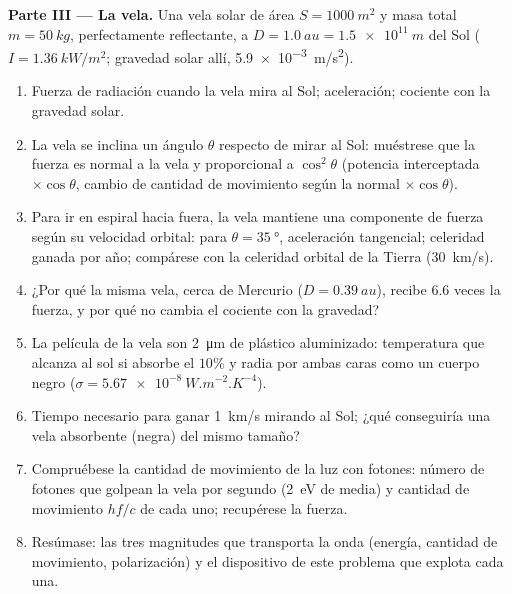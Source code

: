 \begin{problem}
\medskip
\noindent\textbf{Parte III --- La vela.}
Una vela solar de área $S = \qty{1000}{m^2}$ y masa total $m = \qty{50}{kg}$,
perfectamente reflectante, a $D = \qty{1.0}{au} = \qty{1.5e11}{m}$ del Sol
($I = \qty{1.36}{kW/m^2}$; gravedad solar allí, \qty{5.9e-3}{m/s^2}).
\begin{enumerate}[resume]
  \item Fuerza de radiación cuando la vela mira al Sol; aceleración;
        cociente con la gravedad solar.
  \item La vela se inclina un ángulo $\theta$ respecto de mirar al Sol:
        muéstrese que la fuerza es normal a la vela y proporcional a
        $\cos^2\theta$ (potencia interceptada $\times\cos\theta$, cambio de
        cantidad de movimiento según la normal $\times\cos\theta$).
  \item Para ir en espiral hacia fuera, la vela mantiene una componente de
        fuerza según su velocidad orbital: para $\theta = \qty{35}{\degree}$,
        aceleración tangencial; celeridad ganada por año; compárese con la
        celeridad orbital de la Tierra (\qty{30}{km/s}).
  \item ¿Por qué la misma vela, cerca de Mercurio ($D = \qty{0.39}{au}$),
        recibe $6.6$ veces la fuerza, y por qué no cambia el cociente con
        la gravedad?
  \item La película de la vela son \qty{2}{\micro m} de plástico
        aluminizado: temperatura que alcanza al sol si absorbe el $10\%$ y
        radia por ambas caras como un cuerpo negro ($\sigma = \qty{5.67e-8}{W.m^{-2}.K^{-4}}$).
  \item Tiempo necesario para ganar \qty{1}{km/s} mirando al Sol; ¿qué
        conseguiría una vela absorbente (negra) del mismo tamaño?
  \item Compruébese la cantidad de movimiento de la luz con fotones:
        número de fotones que golpean la vela por segundo (\qty{2}{eV} de
        media) y cantidad de movimiento $hf/c$ de cada uno; recupérese la
        fuerza.
  \item Resúmase: las tres magnitudes que transporta la onda (energía,
        cantidad de movimiento, polarización) y el dispositivo de este
        problema que explota cada una.
\end{enumerate}
\end{problem}
